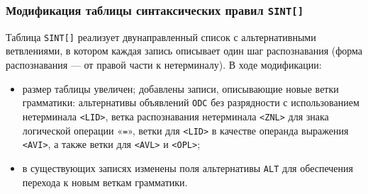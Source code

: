 \documentclass[a4paper,14pt]{extarticle}
\begin{document}
\subsubsection*{Модификация таблицы синтаксических правил \texttt{SINT[]}}

Таблица \texttt{SINT[]} реализует двунаправленный список с альтернативными
ветвлениями, в котором каждая запись описывает один шаг распознавания (форма
распознавания — от правой части к нетерминалу). В ходе модификации:

\begin{itemize}
  \item размер таблицы увеличен; добавлены записи, описывающие новые
        ветки грамматики: альтернативы объявлений \texttt{ODC} без разрядности
        с использованием нетерминала \texttt{<LID>}, ветка распознавания
        нетерминала \texttt{<ZNL>} для знака логической операции «\texttt{=}»,
        ветки для \texttt{<LID>} в качестве операнда выражения \texttt{<AVI>},
        а также ветки для \texttt{<AVL>} и \texttt{<OPL>};
  \item в существующих записях изменены поля альтернативы \texttt{ALT}
        для обеспечения перехода к новым веткам грамматики.
\end{itemize}
\end{document}
